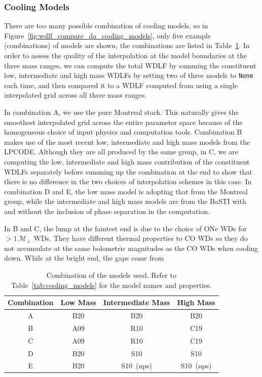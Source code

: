 \documentclass[fleqn,usenatbib]{rasti}
\newcommand{\msun}{\mathcal{M}_{\sun}}
\begin{document}
\subsubsection{Cooling Models}
There are too many possible combination of cooling models, so in
Figure~\ref{fig:wdlf_compare_da_cooling_models}, only five example
(combinations) of models are shown, the combinations are listed in
Table~\ref{tab:cooling_model_combination}. In order to assess the quality of
the interpolation at the model boundaries at the three mass ranges, we can
compute the total WDLF by summing the constituent low, intermediate and high
mass WDLFs by setting two of three models to \texttt{None} each time, and then
compared it to a WDLF computed from using a single interpolated grid across
all three mass ranges.

In combination A, we use the pure Montreal stack. This naturally gives the
smoothest interpolated grid across the entire parameter space because of the
homogeneous choice of input physics and computation tools. Combination B makes
use of the most recent low, intermediate and high mass models from the LPCODE.
Although they are all produced by the same group, in C, we are computing the
low, intermediate and high mass contribution of the constituent WDLFs
separately before summing up the combination at the end to show that there
is no difference in the two choices of interpolation schemes in this case.
In combination D and E, the low mass model is adopting that from the Montreal
group, while the intermediate and high mass models are from the BaSTI with and
without the inclusion of phase separation in the computation.

In B and C, the lump at the faintest end is due to the choice of ONe WDs for
$>1\,\msun$ WDs. They have different thermal properties to CO WDs so
they do not accumulate at the same bolometric magnitudes as the CO WDs when
cooling down. While at the bright end, the gaps come from 

\begin{table}
    \centering
    \begin{tabular}{c|ccc}
        Combination & Low Mass & Intermediate Mass & High Mass \\ \hline\hline
        A     & B20      & B20               & B20 \\
        B     & A09      & R10               & C19 \\
        C     & A09      & R10               & C19 \\
        D     & B20      & S10               & S10 \\
        E     & B20      & S10~(nps)         & S10~(nps) \\
    \end{tabular}
    \caption{Combination of the models used. Refer to
    Table~\ref{tab:cooling_models} for the model names and properties.}
    \label{tab:cooling_model_combination}
\end{table}
\end{document}
